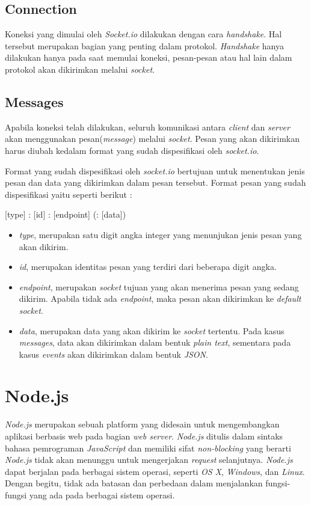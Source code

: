 \subsection{Connection}
Koneksi yang dimulai oleh \textit{Socket.io} dilakukan dengan cara \textit{handshake}. Hal tersebut merupakan bagian yang penting dalam protokol. \textit{Handshake} hanya dilakukan hanya pada saat memulai koneksi, pesan-pesan atau hal lain dalam protokol akan dikirimkan melalui \textit{socket}. 


\subsection{Messages}
Apabila koneksi telah dilakukan, seluruh komunikasi antara \textit{client} dan \textit{server} akan menggunakan pesan(\textit{message}) melalui \textit{socket}. Pesan yang akan dikirimkan harus diubah kedalam format yang sudah dispesifikasi oleh \textit{socket.io}.

Format yang sudah dispesifikasi oleh \textit{socket.io} bertujuan untuk menentukan jenis pesan dan data yang dikirimkan dalam pesan tersebut. Format pesan yang sudah dispesifikasi yaitu seperti berikut : 

[type] : [id] : [endpoint] (: [data])

\begin{itemize}
	\item \textit{type}, merupakan satu digit angka integer yang menunjukan jenis pesan yang akan dikirim.
	\item \textit{id}, merupakan identitas pesan yang terdiri dari beberapa digit angka.
	\item \textit{endpoint}, merupakan \textit{socket} tujuan yang akan menerima pesan yang sedang dikirim. Apabila tidak ada \textit{endpoint}, maka pesan akan dikirimkan ke \textit{default socket}.
	\item \textit{data}, merupakan data yang akan dikirim ke \textit{socket} tertentu. Pada kasus \textit{messages}, data akan dikirimkan dalam bentuk \textit{plain text}, sementara pada kasus \textit{events} akan dikirimkan dalam bentuk \textit{JSON}.
\end{itemize}

\section{Node.js}
\label{sec:Node.js}

\textit{Node.js} merupakan sebuah platform yang didesain untuk mengembangkan aplikasi berbasis web pada bagian \textit{web server}. \textit{Node.js} ditulis dalam sintaks bahasa pemrograman \textit{JavaScript} dan memiliki sifat \textit{non-blocking} yang berarti \textit{Node.js} tidak akan menunggu untuk mengerjakan \textit{request} selanjutnya. \textit{Node.js} dapat berjalan pada berbagai sistem operasi, seperti \textit{OS X}, \textit{Windows}, dan \textit{Linux}. Dengan begitu, tidak ada batasan dan perbedaan dalam menjalankan fungsi-fungsi yang ada pada berbagai sistem operasi.





